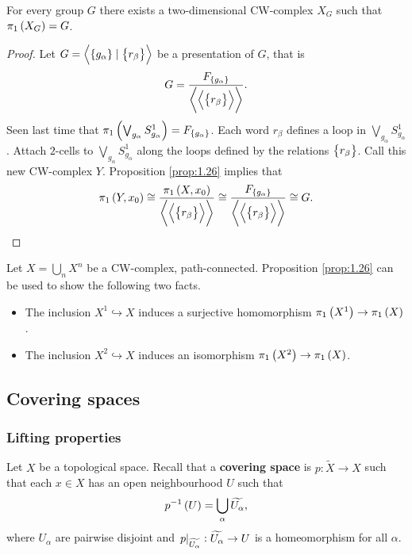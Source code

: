
\begin{corollary}
For every group $ G $ there exists a two-dimensional CW-complex $ X_G $ such that $ \pi_1\br{X_G} = G $.
\end{corollary}

\begin{proof}
Let $ G = \abr{\cbr{g_\alpha} \mid \cbr{r_\beta}} $ be a presentation of $ G $, that is
$$ G = \dfrac{F_{\cbr{g_\alpha}}}{\abr{\abr{\cbr{r_\beta}}}}. $$
Seen last time that $ \pi_1\br{\bigvee_{g_\alpha} S_{g_\alpha}^1} = F_{\cbr{g_\alpha}} $. Each word $ r_\beta $ defines a loop in $ \bigvee_{g_\alpha} S_{g_\alpha}^1 $. Attach $ 2 $-cells to $ \bigvee_{g_\alpha} S_{g_\alpha}^1 $ along the loops defined by the relations $ \cbr{r_\beta} $. Call this new CW-complex $ Y $. Proposition \ref{prop:1.26} implies that
$$ \pi_1\br{Y, x_0} \cong \dfrac{\pi_1\br{X, x_0}}{\abr{\abr{\cbr{r_\beta}}}} \cong \dfrac{F_{\cbr{g_\alpha}}}{\abr{\abr{\cbr{r_\beta}}}} \cong G. $$
\end{proof}

\begin{remark*}
Let $ X = \bigcup_n X^n $ be a CW-complex, path-connected. Proposition \ref{prop:1.26} can be used to show the following two facts.
\begin{itemize}
\item The inclusion $ X^1 \hookrightarrow X $ induces a surjective homomorphism $ \pi_1\br{X^1} \to \pi_1\br{X} $.
\item The inclusion $ X^2 \hookrightarrow X $ induces an isomorphism $ \pi_1\br{X^2} \to \pi_1\br{X} $.
\end{itemize}
\end{remark*}

\pagebreak

\subsection{Covering spaces}

\subsubsection{Lifting properties}

Let $ X $ be a topological space. Recall that a \textbf{covering space} is $ p : \widetilde{X} \to X $ such that each $ x \in X $ has an open neighbourhood $ U $ such that
$$ p^{-1}\br{U} = \bigcup_\alpha \widetilde{U_\alpha}, $$
where $ U_\alpha $ are pairwise disjoint and $ \left. p \right|_{\widetilde{U_\alpha}} : \widetilde{U_\alpha} \to U $ is a homeomorphism for all $ \alpha $.

